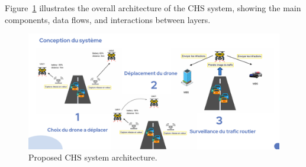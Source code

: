 
Figure~\ref{fig:chs_architecture} illustrates the overall architecture of the CHS system, showing the main components, data flows, and interactions between layers.

\begin{figure}[H]  
    \centering
    \includegraphics[width=1.0\textwidth]{Figures/Chapter4/Section2/archi.png} %
    \caption{Proposed CHS system architecture.}
    \label{fig:chs_architecture} %
\end{figure}




